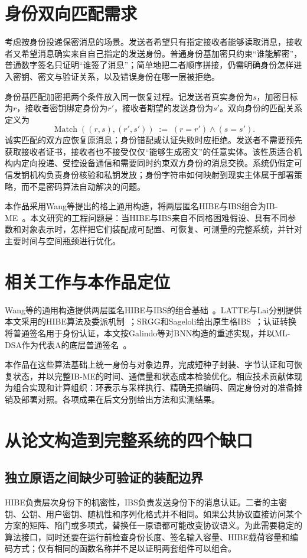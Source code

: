 \documentclass[UTF8,a4paper,12pt,oneside,openany,fontset=fandol]{ctexrep}
\begin{document}
\section{身份双向匹配需求}
考虑按身份投递保密消息的场景。发送者希望只有指定接收者能够读取消息，接收者又希望消息确实来自自己指定的发送身份。普通身份基加密只约束“谁能解密”，普通数字签名只证明“谁签了消息”；简单地把二者顺序拼接，仍需明确身份怎样进入密钥、密文与验证关系，以及错误身份在哪一层被拒绝。

身份基匹配加密把两个条件放入同一恢复过程。记发送者真实身份为\(s\)，加密目标为\(r\)，接收者密钥绑定身份为\(r'\)，接收者期望的发送身份为\(s'\)。双向身份的匹配关系定义为
\[
  \operatorname{Match}((r,s),(r',s'))\;:=\;(r=r')\land(s=s').
\]
诚实匹配的双方应恢复原消息；身份错配或认证失败时应拒绝。发送者不需要预先获取接收者证书，接收者也不接受仅仅“能够生成密文”的任意实体。该性质适合机构内定向投递、受控设备通信和需要同时约束双方身份的消息交换。系统仍假定可信发钥机构负责身份核验和私钥发放；身份字符串如何映射到现实主体属于部署策略，而不是密码算法自动解决的问题。

本作品采用Wang等提出的格上通用构造，将两层匿名HIBE与IBS组合为IB-ME~\cite{wang2024ibme}。本文研究的工程问题是：当HIBE与IBS来自不同格困难假设、具有不同参数和对象表示时，怎样把它们装配成可配置、可恢复、可测量的完整系统，并针对主要时间与空间瓶颈进行优化。

\section{相关工作与本作品定位}
Wang等的通用构造提供两层匿名HIBE与IBS的组合基础~\cite{wang2024ibme}。LATTE与Lai分别提供本文采用的HIBE算法及委派机制~\cite{zhao2024latte,lai2015trapdoors}；SRGG和Sageloli给出原生格IBS~\cite{jia2025ibs,sageloli2023ibs}；认证转换将普通签名用于身份认证，本文按Galindo等对BNN构造的重述实现，并以ML-DSA作为代表A的底层普通签名~\cite{galindo2006ibs,nist2024fips204}。

本作品在这些算法基础上统一身份与对象边界，完成短种子封装、字节认证和可恢复状态，并以完整IB-ME的时间、通信量和状态成本检验优化。相应技术贡献体现为组合实现和计算组织：环表示与采样执行、精确无损编码、固定身份对的准备摊销及部署对照。各项成果在后文分别给出方法和实测结果。

\section{从论文构造到完整系统的四个缺口}

\subsection{独立原语之间缺少可验证的装配边界}
HIBE负责层次身份下的机密性，IBS负责发送身份下的消息认证。二者的主密钥、公钥、用户密钥、随机性和序列化格式并不相同。如果公共协议直接访问某个方案的矩阵、陷门或多项式，替换任一原语都可能改变协议语义。为此需要稳定的算法接口，同时还要在运行前检查身份长度、签名输入容量、HIBE载荷容量和编码方式；仅有相同的函数名称并不足以证明两套组件可以组合。
\end{document}
